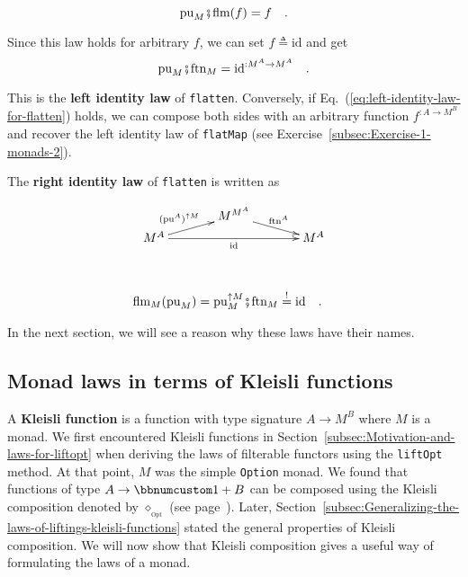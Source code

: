 ~\vspace{-0.8\baselineskip}
\[
\text{pu}_{M}\bef\text{flm}(f)=f\quad.
\]

Since this law holds for arbitrary $f$, we can set $f\triangleq\text{id}$
and get
\begin{equation}
\text{pu}_{M}\bef\text{ftn}_{M}=\text{id}^{:M^{A}\rightarrow M^{A}}\quad.\label{eq:left-identity-law-for-flatten}
\end{equation}
\vspace{-0.5\baselineskip}

This is the \textbf{left identity law} of \lstinline!flatten!. Conversely,
if Eq.~(\ref{eq:left-identity-law-for-flatten}) holds, we can compose
both sides with an arbitrary function $f^{:A\rightarrow M^{B}}$ and
recover the left identity law of \lstinline!flatMap! (see Exercise~\ref{subsec:Exercise-1-monads-2}).

The \textbf{right
identity law} of \lstinline!flatten! is written as

\begin{wrapfigure}{l}{0.32\columnwidth}%
\vspace{-2\baselineskip}

\[
\xymatrix{\xyScaleY{0.2pc}\xyScaleX{3pc} & M^{M^{A}}\ar[rd]\sp(0.5){\ \text{ftn}^{A}\ }\\
M^{A}\ar[ru]\sp(0.5){(\text{pu}^{A})^{\uparrow M}\quad}\ar[rr]\sb(0.5){\text{id}} &  & M^{A}
}
\]
\vspace{-1\baselineskip}
\end{wrapfigure}%

~\vspace{-0.6\baselineskip}
\begin{align}
 & \text{flm}_{M}(\text{pu}_{M})=\text{pu}_{M}^{\uparrow M}\bef\text{ftn}_{M}\overset{!}{=}\text{id}\quad.\label{eq:right-identity-law-for-flatten}
\end{align}
\vspace{-0.1\baselineskip}

In the next section, we will see a reason why these laws have their
names.

\subsection{Monad laws in terms of Kleisli functions}

A \textbf{Kleisli function} is a
function with type signature $A\rightarrow M^{B}$ where $M$ is a
monad. We first encountered Kleisli functions in Section~\ref{subsec:Motivation-and-laws-for-liftopt}
when deriving the laws of filterable functors using the \lstinline!liftOpt!
method. At that point, $M$ was the simple \lstinline!Option! monad.
We found that functions of type $A\rightarrow\bbnum 1+B$ can be composed
using the Kleisli composition denoted by $\diamond_{_{\text{Opt}}}$
(see page~\pageref{kleisli-composition}). Later, Section~\ref{subsec:Generalizing-the-laws-of-liftings-kleisli-functions}
stated the general properties of Kleisli composition. We will now
show that Kleisli composition gives a useful way of formulating the
laws of a monad.

